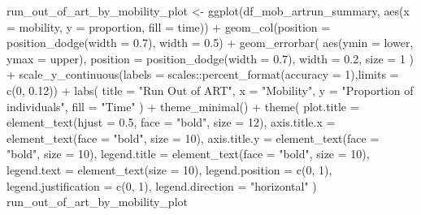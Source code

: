 \documentclass[
  letterpaper,
  DIV=11,
  numbers=noendperiod]{scrartcl}
\newenvironment{Shaded}{\begin{snugshade}}{\end{snugshade}}
\newcommand{\AttributeTok}[1]{\textcolor[rgb]{0.40,0.45,0.13}{#1}}
\newcommand{\DecValTok}[1]{\textcolor[rgb]{0.68,0.00,0.00}{#1}}
\newcommand{\FloatTok}[1]{\textcolor[rgb]{0.68,0.00,0.00}{#1}}
\newcommand{\FunctionTok}[1]{\textcolor[rgb]{0.28,0.35,0.67}{#1}}
\newcommand{\NormalTok}[1]{\textcolor[rgb]{0.00,0.23,0.31}{#1}}
\newcommand{\OtherTok}[1]{\textcolor[rgb]{0.00,0.23,0.31}{#1}}
\newcommand{\SpecialCharTok}[1]{\textcolor[rgb]{0.37,0.37,0.37}{#1}}
\newcommand{\StringTok}[1]{\textcolor[rgb]{0.13,0.47,0.30}{#1}}
\begin{document}
\begin{Shaded}
\begin{Highlighting}[]
\NormalTok{run\_out\_of\_art\_by\_mobility\_plot }\OtherTok{\textless{}{-}} \FunctionTok{ggplot}\NormalTok{(df\_mob\_artrun\_summary, }\FunctionTok{aes}\NormalTok{(}\AttributeTok{x =}\NormalTok{ mobility, }\AttributeTok{y =}\NormalTok{ proportion, }\AttributeTok{fill =}\NormalTok{ time)) }\SpecialCharTok{+}
  \FunctionTok{geom\_col}\NormalTok{(}\AttributeTok{position =} \FunctionTok{position\_dodge}\NormalTok{(}\AttributeTok{width =} \FloatTok{0.7}\NormalTok{), }\AttributeTok{width =} \FloatTok{0.5}\NormalTok{) }\SpecialCharTok{+}
  \FunctionTok{geom\_errorbar}\NormalTok{(}
    \FunctionTok{aes}\NormalTok{(}\AttributeTok{ymin =}\NormalTok{ lower, }\AttributeTok{ymax =}\NormalTok{ upper),}
    \AttributeTok{position =} \FunctionTok{position\_dodge}\NormalTok{(}\AttributeTok{width =} \FloatTok{0.7}\NormalTok{),}
    \AttributeTok{width =} \FloatTok{0.2}\NormalTok{,}
    \AttributeTok{size =} \DecValTok{1}
\NormalTok{  ) }\SpecialCharTok{+}
  \FunctionTok{scale\_y\_continuous}\NormalTok{(}\AttributeTok{labels =}\NormalTok{ scales}\SpecialCharTok{::}\FunctionTok{percent\_format}\NormalTok{(}\AttributeTok{accuracy =} \DecValTok{1}\NormalTok{),}\AttributeTok{limits =} \FunctionTok{c}\NormalTok{(}\DecValTok{0}\NormalTok{, }\FloatTok{0.12}\NormalTok{)) }\SpecialCharTok{+}
  \FunctionTok{labs}\NormalTok{(}
    \AttributeTok{title =} \StringTok{"Run Out of ART"}\NormalTok{,}
    \AttributeTok{x =} \StringTok{"Mobility"}\NormalTok{,}
    \AttributeTok{y =} \StringTok{"Proportion of individuals"}\NormalTok{,}
    \AttributeTok{fill =} \StringTok{"Time"}
\NormalTok{  ) }\SpecialCharTok{+}
  \FunctionTok{theme\_minimal}\NormalTok{() }\SpecialCharTok{+}
  \FunctionTok{theme}\NormalTok{(}
    \AttributeTok{plot.title =} \FunctionTok{element\_text}\NormalTok{(}\AttributeTok{hjust =} \FloatTok{0.5}\NormalTok{, }\AttributeTok{face =} \StringTok{"bold"}\NormalTok{, }\AttributeTok{size =} \DecValTok{12}\NormalTok{),}
    \AttributeTok{axis.title.x =} \FunctionTok{element\_text}\NormalTok{(}\AttributeTok{face =} \StringTok{"bold"}\NormalTok{, }\AttributeTok{size =} \DecValTok{10}\NormalTok{),}
    \AttributeTok{axis.title.y =} \FunctionTok{element\_text}\NormalTok{(}\AttributeTok{face =} \StringTok{"bold"}\NormalTok{, }\AttributeTok{size =} \DecValTok{10}\NormalTok{),}
    \AttributeTok{legend.title =} \FunctionTok{element\_text}\NormalTok{(}\AttributeTok{face =} \StringTok{"bold"}\NormalTok{, }\AttributeTok{size =} \DecValTok{10}\NormalTok{),}
    \AttributeTok{legend.text =} \FunctionTok{element\_text}\NormalTok{(}\AttributeTok{size =} \DecValTok{10}\NormalTok{),}
    \AttributeTok{legend.position =} \FunctionTok{c}\NormalTok{(}\DecValTok{0}\NormalTok{, }\DecValTok{1}\NormalTok{),}
    \AttributeTok{legend.justification =} \FunctionTok{c}\NormalTok{(}\DecValTok{0}\NormalTok{, }\DecValTok{1}\NormalTok{),}
    \AttributeTok{legend.direction =} \StringTok{"horizontal"}
\NormalTok{  )}
\NormalTok{run\_out\_of\_art\_by\_mobility\_plot}
\end{Highlighting}
\end{Shaded}
\end{document}
